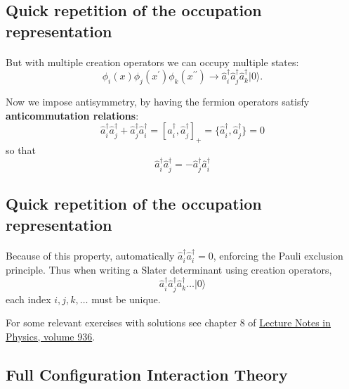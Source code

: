 \documentclass[%
oneside,                 %
final,                   %
10pt]{article}
\begin{document}
\subsection*{Quick repetition  of the occupation representation}

\paragraph{}
But with multiple creation operators we can occupy multiple states:
\[
\phi_i(x) \phi_j(x^\prime) \phi_k(x^{\prime \prime}) 
\rightarrow \hat{a}^\dagger_i \hat{a}^\dagger_j \hat{a}^\dagger_k |0 \rangle.
\]

Now we impose antisymmetry, by having the fermion operators satisfy  \textbf{anticommutation relations}:
\[
\hat{a}^\dagger_i \hat{a}^\dagger_j + \hat{a}^\dagger_j \hat{a}^\dagger_i
= [ \hat{a}^\dagger_i ,\hat{a}^\dagger_j ]_+ 
= \{ \hat{a}^\dagger_i ,\hat{a}^\dagger_j \} = 0
\]
so that 
\[
\hat{a}^\dagger_i \hat{a}^\dagger_j = - \hat{a}^\dagger_j \hat{a}^\dagger_i
\]



\subsection*{Quick repetition  of the occupation representation}

\paragraph{}
Because of this property, automatically $\hat{a}^\dagger_i \hat{a}^\dagger_i = 0$, 
enforcing the Pauli exclusion principle.  Thus when writing a Slater determinant 
using creation operators, 
\[
\hat{a}^\dagger_i \hat{a}^\dagger_j \hat{a}^\dagger_k \ldots |0 \rangle
\]
each index $i,j,k, \ldots$ must be unique.

For some relevant exercises with solutions see chapter 8 of \href{{http://www.springer.com/us/book/9783319533353}}{Lecture Notes in Physics, volume 936}.



\subsection*{Full Configuration Interaction Theory}

\end{document}
